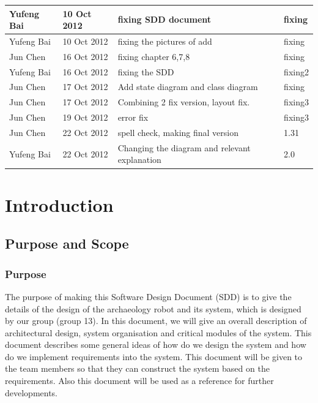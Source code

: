 \documentclass[11pt, a4paper]{report}
\begin{document}
\begin{tabular}{| l | l | l | l | }
Yufeng Bai	&	10 Oct 2012	&	fixing SDD document				&	fixing	\\ \hline
Yufeng Bai	&	10 Oct 2012	& fixing the pictures of add	&	fixing \\ \hline
Jun Chen     		&16 Oct 2012        	&	fixing chapter 6,7,8                  	  	&	fixing   	\\ \hline
Yufeng Bai	&	16 Oct 2012		& fixing the SDD			&	fixing2 \\ \hline
Jun Chen    		&	17 Oct 2012     	&	Add state diagram and class diagram                  	  	&	fixing     	\\ \hline
Jun Chen    		&	17 Oct 2012       	&	Combining 2 fix version, layout fix.               	  	&	fixing3   	\\ \hline
Jun Chen    		&	 19 Oct 2012     	&	error fix                  	  	&	fixing3   	\\ \hline
Jun Chen      		&	22 Oct 2012       	&	spell check, making final version                  	  	&	1.31     	\\ \hline
Yufeng Bai		&   22 Oct 2012		&	Changing the diagram and relevant explanation	&	2.0 \\ \hline
%





\end{tabular}
\clearpage


\chapter{Introduction}%
\label{cha:I}


\section{Purpose and Scope}
\subsection{Purpose}
The purpose of making this Software Design Document (SDD) is to give the details of the design of the archaeology robot and its system, which is designed by our group (group 13). In this document, we will give an overall description of architectural design, system organisation and critical modules of the system. This document describes some general ideas of how do we design the system and how do we implement requirements into the system. This document will be given to the team members so that they can construct the system based on the requirements. Also this document will be used as a reference for further developments.
\end{document}
